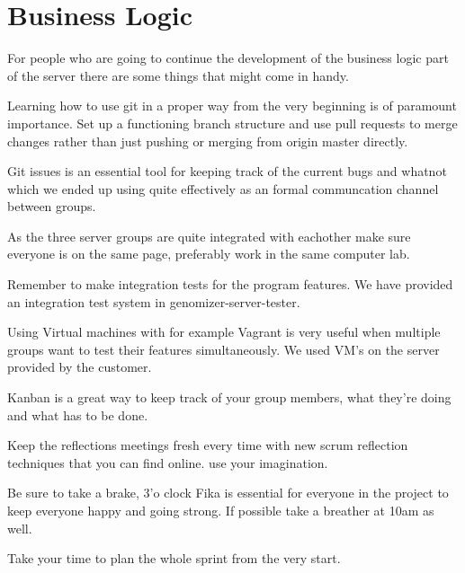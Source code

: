 \section{Business Logic}

For people who are going to continue the development of the business logic part of the server there are some things that might come in handy.

Learning how to use git in a proper way from the very beginning is of paramount importance. Set up a functioning branch structure and use pull requests to merge changes rather than just pushing or merging from origin master directly.

Git issues is an essential tool for keeping track of the current bugs and whatnot which we ended up using quite effectively as an formal communcation channel between groups.

As the three server groups are quite integrated with eachother make sure everyone is on the same page, preferably work in the same computer lab.

Remember to make integration tests for the program features. We have provided an integration test system in genomizer-server-tester.

Using Virtual machines with for example Vagrant is very useful when multiple groups want to test their features simultaneously. We used VM's on the server provided by the customer.

Kanban is a great way to keep track of your group members, what they're doing and what has to be done. 

Keep the reflections meetings fresh every time with new scrum reflection techniques that you can find online. use your imagination.

Be sure to take a brake, 3'o clock Fika is essential for everyone in the project to keep everyone happy and going strong. If possible take a breather at 10am as well.

Take your time to plan the whole sprint from the very start.
